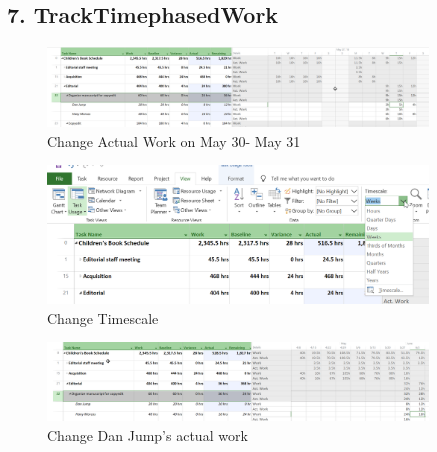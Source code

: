\documentclass[runningheads]{llncs}
\begin{document}
\subsection*{7. TrackTimephasedWork}
\begin{figure}[H]
    \centering
    \includegraphics[width=0.9\textwidth]{./image/t6f1}
    \caption{Change Actual Work on May 30- May 31}
\end{figure}
\begin{figure}[H]
    \centering
    \includegraphics[width=0.9\textwidth]{./image/t6f2}
    \caption{Change Timescale}
\end{figure}
\begin{figure}[H]
    \centering
    \includegraphics[width=0.9\textwidth]{./image/t6f3}
    \caption{Change Dan Jump's actual work}
\end{figure}
\end{document}
